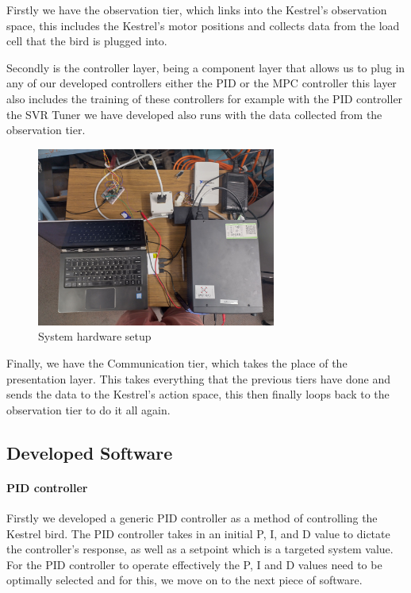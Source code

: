     Firstly we have the observation
    tier, which links into the Kestrel’s observation space, this includes
    the Kestrel’s motor positions and collects data from the load cell that
    the bird is plugged into.

    Secondly is the controller layer, being a
    component layer that allows us to plug in any of our developed controllers
    either the PID or the MPC controller this layer also includes the training
    of these controllers for example with the PID controller the SVR Tuner we
    have developed also runs with the data collected from the observation tier.

    \begin{figure}[h]
        \begin{center}
            \includegraphics[width=0.7\textwidth]{./img/hardware_setup.jpeg}
        \end{center}
        \caption{System hardware setup}\label{fig:hardware_setup}
    \end{figure}

    
    Finally, we have the Communication tier, which takes the place of the
    presentation layer. This takes everything that the previous tiers have done
    and sends the data to the Kestrel’s action space, this then finally loops
    back to the observation tier to do it all again.

    \subsection{Developed Software}

    \paragraph{PID controller} Firstly we developed a generic PID
    controller as a method of controlling the Kestrel bird. The PID
    controller takes in an initial P, I, and D value to dictate the
    controller's response, as well as a setpoint which is a targeted
    system value. For the PID controller to operate effectively the
    P, I and D values need to be optimally selected and for this, we
    move on to the next piece of software.
    
